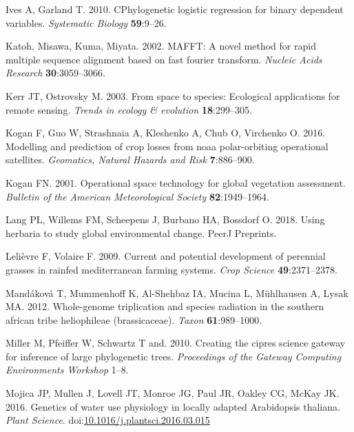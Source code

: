 \documentclass[man,floatsintext]{apa6}
\theoremstyle{definition}
\theoremstyle{definition}
\theoremstyle{definition}
\theoremstyle{remark}
\begin{document}
\leavevmode\hypertarget{ref-ives2010phylogenetic}{}%
Ives A, Garland T. 2010. CPhylogenetic logistic regression for binary
dependent variables. \emph{Systematic Biology} \textbf{59}:9--26.

\leavevmode\hypertarget{ref-katoh2002mafft}{}%
Katoh, Misawa, Kuma, Miyata. 2002. MAFFT: A novel method for rapid
multiple sequence alignment based on fast fourier transform.
\emph{Nucleic Acids Research} \textbf{30}:3059--3066.

\leavevmode\hypertarget{ref-kerr2003space}{}%
Kerr JT, Ostrovsky M. 2003. From space to species: Ecological
applications for remote sensing. \emph{Trends in ecology \& evolution}
\textbf{18}:299--305.

\leavevmode\hypertarget{ref-kogan2016modelling}{}%
Kogan F, Guo W, Strashnaia A, Kleshenko A, Chub O, Virchenko O. 2016.
Modelling and prediction of crop losses from noaa polar-orbiting
operational satellites. \emph{Geomatics, Natural Hazards and Risk}
\textbf{7}:886--900.

\leavevmode\hypertarget{ref-kogan2001operational}{}%
Kogan FN. 2001. Operational space technology for global vegetation
assessment. \emph{Bulletin of the American Meteorological Society}
\textbf{82}:1949--1964.

\leavevmode\hypertarget{ref-lang2018using}{}%
Lang PL, Willems FM, Scheepens J, Burbano HA, Bossdorf O. 2018. Using
herbaria to study global environmental change. PeerJ Preprints.

\leavevmode\hypertarget{ref-lelievre2009current}{}%
Lelièvre F, Volaire F. 2009. Current and potential development of
perennial grasses in rainfed mediterranean farming systems. \emph{Crop
Science} \textbf{49}:2371--2378.

\leavevmode\hypertarget{ref-mandakova2012whole}{}%
Mandáková T, Mummenhoff K, Al-Shehbaz IA, Mucina L, Mühlhausen A, Lysak
MA. 2012. Whole-genome triplication and species radiation in the
southern african tribe heliophileae (brassicaceae). \emph{Taxon}
\textbf{61}:989--1000.

\leavevmode\hypertarget{ref-miller2010creating}{}%
Miller M, Pfeiffer W, Schwartz T and. 2010. Creating the cipres science
gateway for inference of large phylogenetic trees. \emph{Proceedings of
the Gateway Computing Environments Workshop} 1--8.

\leavevmode\hypertarget{ref-Mojica2016}{}%
Mojica JP, Mullen J, Lovell JT, Monroe JG, Paul JR, Oakley CG, McKay JK.
2016. Genetics of water use physiology in locally adapted Arabidopsis
thaliana. \emph{Plant Science}.
doi:\href{https://doi.org/10.1016/j.plantsci.2016.03.015}{10.1016/j.plantsci.2016.03.015}
\end{document}
